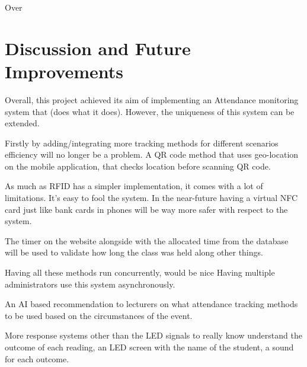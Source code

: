 Over

\section{Discussion and Future Improvements}

Overall, this project achieved its aim of implementing an Attendance monitoring system that (does what it does). However, the uniqueness of this system can be extended.

Firstly by adding/integrating more tracking methods for different scenarios efficiency will no longer be a problem.
A QR code method that uses geo-location on the mobile application, that checks location before scanning QR code.

As much as RFID has a simpler implementation, it comes with a lot of limitations. It's easy to fool the system. In the near-future having a virtual NFC card just like bank cards in phones will be way more safer with respect to the system.

The timer on the website alongside with the allocated time from the database will be used to validate how long the class was held along other things.

Having all these methods run concurrently, would be nice
Having multiple administrators use this system asynchronously.

An AI based recommendation to lecturers on what attendance tracking methods to be used based on the circumstances of the event.

More response systems other than the LED signals to really know understand the outcome of each reading, an LED screen with the name of the student, a sound for each outcome.